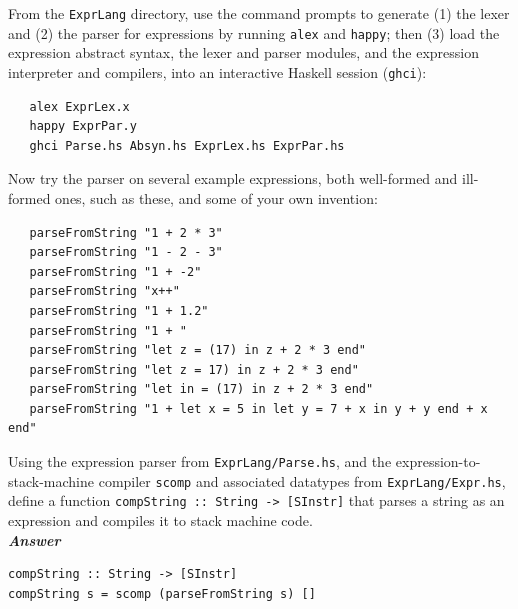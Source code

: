 \documentclass[a4paper]{article}
\begin{document}
\begin{exercise}\label{exer-expr-parse-try}
  From the \texttt{ExprLang} directory, use the command prompts
  to generate (1) the lexer and (2) the parser for
  expressions by running \texttt{alex} and \texttt{happy}; then (3)
  load the expression abstract syntax, the lexer and parser modules,
  and the expression interpreter and compilers, into an interactive
  Haskell session (\texttt{ghci}):

{\codesetup\begin{verbatim}
   alex ExprLex.x
   happy ExprPar.y
   ghci Parse.hs Absyn.hs ExprLex.hs ExprPar.hs
\end{verbatim}} 

\noindent 
Now try the parser on several example expressions, both well-formed
and ill-formed ones, such as these, and some of your own invention:

{\codesetup\begin{verbatim}
   parseFromString "1 + 2 * 3"
   parseFromString "1 - 2 - 3"
   parseFromString "1 + -2"
   parseFromString "x++"
   parseFromString "1 + 1.2"
   parseFromString "1 + "
   parseFromString "let z = (17) in z + 2 * 3 end"
   parseFromString "let z = 17) in z + 2 * 3 end"
   parseFromString "let in = (17) in z + 2 * 3 end"
   parseFromString "1 + let x = 5 in let y = 7 + x in y + y end + x end"
\end{verbatim}}  
  
\end{exercise}


\begin{exercise}\label{exer-expr-parse+scomp}
  Using the expression parser from \texttt{ExprLang/Parse.hs}, and the
  expression-to-stack-machine compiler \texttt{scomp} and associated
  datatypes from \texttt{ExprLang/Expr.hs}, define a function
  \texttt{compString ::\ String -> [SInstr]} that parses a string as
  an expression and compiles it to stack machine code.\\
  
\noindent
\textbf{\emph{Answer}} 
{\codesetup\begin{verbatim}
compString :: String -> [SInstr]
compString s = scomp (parseFromString s) []
\end{verbatim}} 
\end{exercise}
\end{document}
